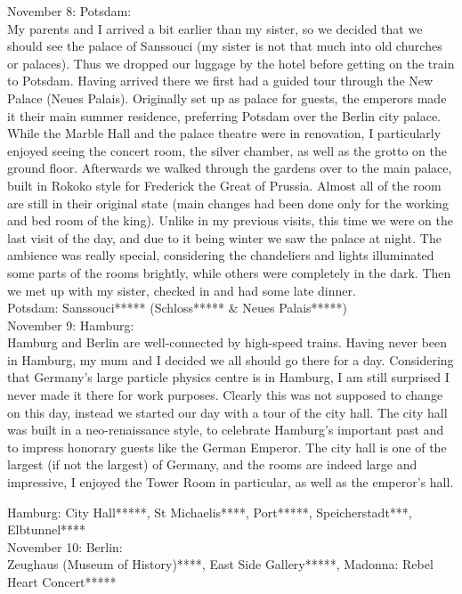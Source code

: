 November 8: Potsdam:\\
My parents and I arrived a bit earlier than my sister, so we decided that we should see the palace of Sanssouci (my sister is not that much into old churches or palaces). Thus we dropped our luggage by the hotel before getting on the train to Potsdam. Having arrived there we first had a guided tour through the New Palace (Neues Palais). Originally set up as palace for guests, the emperors made it their main summer residence, preferring Potsdam over the Berlin city palace. While the Marble Hall and the palace theatre were in renovation, I particularly enjoyed seeing the concert room, the silver chamber, as well as the grotto on the ground floor. Afterwards we walked through the gardens over to the main palace, built in Rokoko style for Frederick the Great of Prussia. Almost all of the room are still in their original state (main changes had been done only for the working and bed room of the king). Unlike in my previous visits, this time we were on the last visit of the day, and due to it being winter we saw the palace at night. The ambience was really special, considering the chandeliers and lights illuminated some parts of the rooms brightly, while others were completely in the dark. Then we met up with my sister, checked in and had some late dinner.\\

Potsdam: Sanssouci***** (Schloss***** \& Neues Palais*****)\\

November 9: Hamburg:\\
Hamburg and Berlin are well-connected by high-speed trains. Having never been in Hamburg, my mum and I decided we all should go there for a day. Considering that Germany's large particle physics centre is in Hamburg, I am still surprised I never made it there for work purposes. Clearly this was not supposed to change on this day, instead we started our day with a tour of the city hall. The city hall was built in a neo-renaissance style, to celebrate Hamburg's important past and to impress honorary guests like the German Emperor. The city hall is one of the largest (if not the largest) of Germany, and the rooms are indeed large and impressive, I enjoyed the Tower Room in particular, as well as the emperor's hall. 

Hamburg: City Hall*****, St Michaelis****, Port*****, Speicherstadt***, Elbtunnel****\\

November 10: Berlin:\\
Zeughaus (Museum of History)****, East Side Gallery*****, Madonna: Rebel Heart Concert*****\\

